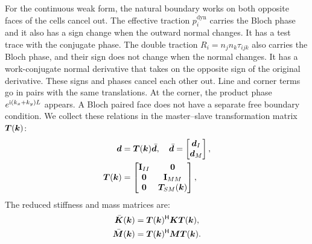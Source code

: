 For the continuous weak form, the natural boundary works on both opposite faces of the cells cancel out. The effective traction $p_i^{\mathrm{dyn}}$ carries the Bloch phase and it also has a sign change when the outward normal changes. It has a test trace with the conjugate phase. The double traction $R_i=n_jn_k\tau_{ijk}$ also carries the Bloch phase, and their sign does not change when the normal changes. It has a work-conjugate normal derivative that takes on the opposite sign of the original derivative. These signs and phases cancel each other out. Line and corner terms go in pairs with the same translations. At the corner, the product phase $e^{\mathrm{i}(k_x+k_y)L}$ appears. A Bloch paired face does not have a separate free boundary condition.
We collect these relations in the master--slave transformation matrix $\bm{T}(\bm{k})$:
\begin{equation}
\begin{split}
\bm{d} &= \bm{T}(\bm{k}) \bar{\bm{d}}, \quad \bar{\bm{d}} = \begin{bmatrix} \bm{d}_I \\ \bm{d}_M \end{bmatrix}, \\
\bm{T}(\bm{k}) &= \begin{bmatrix} \mathbf{I}_{II} & \mathbf{0} \\ \mathbf{0} & \mathbf{I}_{MM} \\ \mathbf{0} & \bm{T}_{SM}(\bm{k}) \end{bmatrix},
\end{split}
\label{eq:T_bloch}
\end{equation}
The reduced stiffness and mass matrices are:
\begin{equation}
\begin{split}
\bar{\bm{K}}(\bm{k}) &= \bm{T}(\bm{k})^\mathsf{H} \bm{K} \bm{T}(\bm{k}), \\
\bar{\bm{M}}(\bm{k}) &= \bm{T}(\bm{k})^\mathsf{H} \bm{M} \bm{T}(\bm{k}).
\end{split}
\label{eq:reduced_KM}
\end{equation}

